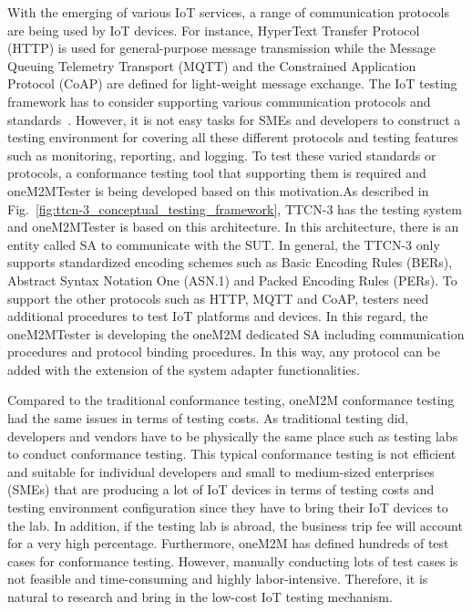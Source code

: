 With the emerging of various IoT services, a range of communication protocols are being used by IoT devices. For instance, HyperText Transfer Protocol (HTTP) is used for general-purpose message transmission while the Message Queuing Telemetry Transport (MQTT) and the Constrained Application Protocol (CoAP) are defined for light-weight message exchange. The IoT testing framework has to consider supporting various communication protocols and standards~\cite{schieferdecker2017iot}. However, it is not easy tasks for SMEs and developers to construct a testing environment for covering all these different protocols and testing features such as monitoring, reporting, and logging. To test these varied standards or protocols, a conformance testing tool that supporting them is required and oneM2MTester is being developed based on this motivation.As described in Fig.~\ref{fig:ttcn-3_conceptual_testing_framework}, TTCN-3 has the testing system and oneM2MTester is based on this architecture. In this architecture, there is an entity called SA to communicate with the SUT. In general, the TTCN-3 only supports standardized encoding schemes such as Basic Encoding Rules (BERs), Abstract Syntax Notation One (ASN.1) and Packed Encoding Rules (PERs). To support the other protocols such as HTTP, MQTT and CoAP, testers need additional procedures to test IoT platforms and devices. In this regard, the oneM2MTester is developing the oneM2M dedicated SA including communication procedures and protocol binding procedures. In this way, any protocol can be added with the extension of the system adapter functionalities.

Compared to the traditional conformance testing, oneM2M conformance testing had the same issues in terms of testing costs. As traditional testing did, developers and vendors have to be physically the same place such as testing labs to conduct conformance testing. This typical conformance testing is not efficient and suitable for individual developers and small to medium-sized enterprises (SMEs) that are producing a lot of IoT devices in terms of testing costs and testing environment configuration since they have to bring their IoT devices to the lab. In addition, if the testing lab is abroad, the business trip fee will account for a very high percentage. Furthermore, oneM2M has defined hundreds of test cases for conformance testing. However, manually conducting lots of test cases is not feasible and time-consuming and highly labor-intensive. Therefore, it is natural to research and bring in the low-cost IoT testing mechanism.

